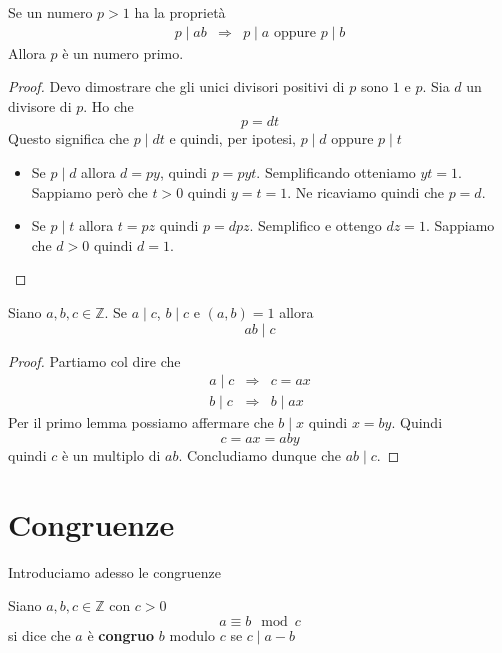 \begin{lemma}
	Se un numero $p > 1$ ha la propriet\`a
	\begin{equation*}
		\begin{array}{lll}
			p \mid ab & \Rightarrow & p \mid a \text{ oppure } p \mid b
		\end{array}
	\end{equation*}
	Allora $p$ \`e un numero primo.
	\begin{proof}
		Devo dimostrare che gli unici divisori positivi di $p$ sono $1$ e $p$.
		Sia $d$ un divisore di $p$. Ho che
		\begin{equation*}
			p = dt
		\end{equation*}
		Questo significa che $p \mid dt$ e quindi, per ipotesi, $p \mid d$ oppure $p \mid t$
		\begin{itemize}
			\item Se $p \mid d$ allora $d = py$, quindi $p = pyt$. Semplificando otteniamo
			      $yt = 1$. Sappiamo per\`o che $t > 0$ quindi $y = t = 1$. Ne ricaviamo
			      quindi che $p = d$.
			\item Se $p \mid t$ allora $t = pz$ quindi $p = dpz$. Semplifico e ottengo
			      $dz = 1$. Sappiamo che $d > 0$ quindi $d = 1$.
		\end{itemize}
	\end{proof}
\end{lemma}

\begin{lemma}
	Siano $a, b, c \in \mathbb{Z}$. Se $a \mid c$, $b \mid c$ e $(a, b) = 1$ allora
	\begin{equation*}
		ab \mid c
	\end{equation*}
	\begin{proof}
		Partiamo col dire che
		\begin{equation*}
			\begin{array}{lll}
				a \mid c & \Rightarrow & c = ax    \\
				b \mid c & \Rightarrow & b \mid ax
			\end{array}
		\end{equation*}
		Per il primo lemma possiamo affermare che $b \mid x$ quindi $x = by$. Quindi
		\begin{equation*}
			c = ax = aby
		\end{equation*}
		quindi $c$ \`e un multiplo di $ab$. Concludiamo dunque che $ab \mid c$.
	\end{proof}
\end{lemma}

\section{Congruenze}
Introduciamo adesso le congruenze
\begin{definition}
	Siano $a, b, c \in \mathbb{Z}$ con $c > 0$
	\begin{equation*}
		a \equiv b \mod{c}
	\end{equation*}
	si dice che $a$ \`e \textbf{congruo} $b$ modulo $c$ se $c \mid a - b$
\end{definition}

